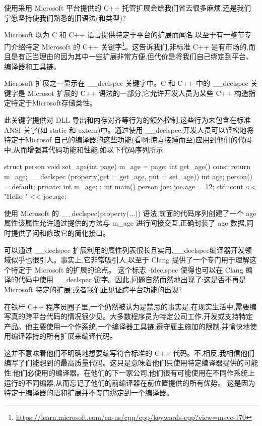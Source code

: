 使用采用 Microsoft 平台提供的 C++ 托管扩展会给我们省去很多麻烦,还是我们宁愿坚持使我们熟悉的旧语法(和类型)? 

Microsoft 以为 C 和 C++ 语言提供特定于平台的扩展而闻名,以至于有一整节专门介绍特定 Microsoft 的 C++ 关键字\footnote{\url{https://learn.microsoft.com/en-us/cpp/cpp/keywords-cpp?view=msvc-170}}。这告诉我们,非标准 C++ 是有市场的,而且是有正当理由的因为其中一些扩展非常方便,但代价是将我们自己绑定到平台、编译器和工具链。

Microsoft 扩展之一显示在 \_\_declspec 关键字中。C 和 C++ 中的 \_\_declspec 关键字是 Microsot 扩展的 C++ 语法的一部分,它允许开发人员为某些 C++ 构造指定特定于Microsoft存储类性。

此关键字提供对 DLL 导出和内存对齐等行为的额外控制,这些行为未包含在标准 ANSI 关字(如 static 和 extern)中。通过使用 \_\_declspec,开发人员可以轻松地将特定于Microsof 自己的编译器的这些功能(看啊:惊喜接踵而至)应用到他们的代码中,从而增强其代码功能和性能,如以下代码序列所示:

\begin{cpp}
struct person {
  void set_age(int page) { m_age = page; }
  int get_age() const { return m_age; }
  __declspec (property(get = get_age, put = set_age)) int age;
  person() = default;
private:
  int m_age;
};
int main() {
  person joe;
  joe.age = 12;
  std::cout << "Hello " << joe.age;
}
\end{cpp}

使用 Microsoft 的 \_\_declspec(property(...)) 语法,前面的代码序列创建了一个 age 属性该属性允许通过提供的方法与 m\_age 进行间接交互,正确封装了 age 数据,同时提供了问和修改它的简化接口。

可以通过 \_\_declspec 扩展利用的属性列表很长且实用,\_\_declspec编译器开发领域似乎也很引人。事实上,它非常吸引人,以至于 Clang 提供了一个专门用于理解这个特定于 Microsoft 的扩展的论点。 这个标志 -fdeclspec 使得也可以在 Clang 编译的代码中使用 \_\_declspec 键字。因此,问题自然而然地出现了:这是否不再是 Microsoft 特定的扩展,或者我们正见证跨平台功能的出现?

在铁杆 C++ 程序员圈子里,一个仍然被认为是禁忌的事实是,在现实生活中,需要编写真的跨平台代码的情况很少见。大多数程序员为特定公司工作,开发或支持特定产品。他主要使用一个作系统,一个编译器工具链,遵守雇主施加的限制,并愉快地使用编译器持的所有扩展来编译代码。

这并不意味着他们不明确地想要编写符合标准的 C++ 代码。不,相反,我相信他们编写了们能想到的最高质量代码。这只是意味着他们只使用特定编译器提供的可能性:他们必使用的编译器。在他们的下一家公司,他们很有可能使用在不同作系统上运行的不同编器,从而忘记了他们的前编译器在前位置提供的所有优势。 这是因为特定于编译器的语和扩展并不专门绑定到一个编译器。


